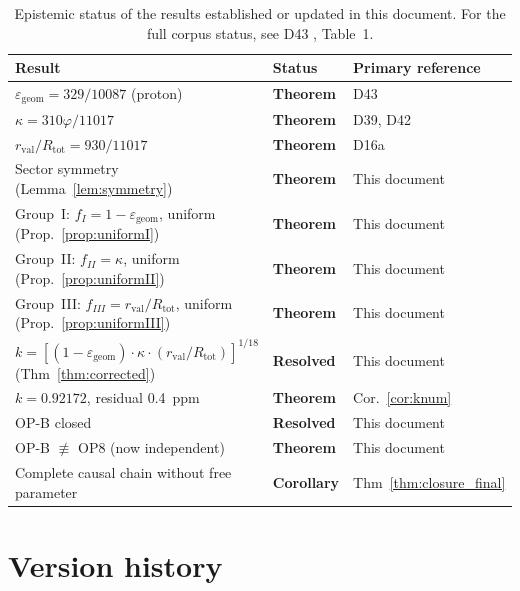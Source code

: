 \documentclass[12pt,a4paper]{article}
\theoremstyle{plain}
\theoremstyle{definition}
\theoremstyle{remark}
\newcommand{\vp}{\varphi}
\newcommand{\kap}{\kappa}
\newcommand{\rval}{r_{\mathrm{val}}}
\newcommand{\Rtot}{R_{\mathrm{tot}}}
\newcommand{\egeom}{\varepsilon_{\mathrm{geom}}}
\begin{document}
\begin{table}[H]
\centering
\caption{Epistemic status of the results established or updated in this document. For the full corpus status, see D43 \citep{D43}, Table~1.}
\label{tab:epistemic}
\medskip
\begin{tabular}{>{\raggedright}p{7.5cm} p{2.2cm} p{4.5cm}}
\toprule
Result & Status & Primary reference \\
\midrule
$\egeom = 329/10087$ (proton) & \textcolor{proofblue}{\textbf{Theorem}} & D43 \citep{D43} \\[2pt]
$\kap = 310\vp/11017$ & \textcolor{proofblue}{\textbf{Theorem}} & D39, D42 \citep{D39,D42} \\[2pt]
$\rval/\Rtot = 930/11017$ & \textcolor{proofblue}{\textbf{Theorem}} & D16a \citep{D16a} \\[2pt]
Sector symmetry (Lemma~\ref{lem:symmetry}) & \textcolor{proofblue}{\textbf{Theorem}} & This document \\[2pt]
Group~I: $f_I = 1-\egeom$, uniform (Prop.~\ref{prop:uniformI}) & \textcolor{proofblue}{\textbf{Theorem}} & This document \\[2pt]
Group~II: $f_{II} = \kap$, uniform (Prop.~\ref{prop:uniformII}) & \textcolor{proofblue}{\textbf{Theorem}} & This document \\[2pt]
Group~III: $f_{III} = \rval/\Rtot$, uniform (Prop.~\ref{prop:uniformIII}) & \textcolor{proofblue}{\textbf{Theorem}} & This document \\[2pt]
$k = [(1-\egeom)\cdot\kap\cdot(\rval/\Rtot)]^{1/18}$ (Thm~\ref{thm:corrected}) & \textcolor{resolvedgreen}{\textbf{Resolved}} & This document \\[2pt]
$k = 0.92172$, residual 0.4~ppm & \textcolor{proofblue}{\textbf{Theorem}} & Cor.~\ref{cor:knum} \\[2pt]
OP-B closed & \textcolor{resolvedgreen}{\textbf{Resolved}} & This document \\[2pt]
OP-B $\not\equiv$ OP8 (now independent) & \textcolor{proofblue}{\textbf{Theorem}} & This document \\[2pt]
Complete causal chain without free parameter & \textcolor{proofblue}{\textbf{Corollary}} & Thm~\ref{thm:closure_final} \\[2pt]
\bottomrule
\end{tabular}
\end{table}

\appendix
\section{Version history}
\label{app:versions}
\end{document}
